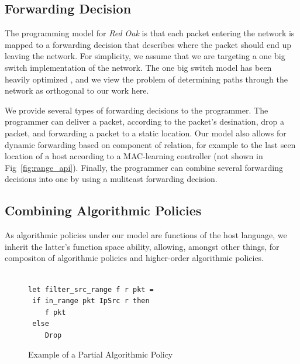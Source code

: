 \documentclass[preprint]{sigplanconf}
\begin{document}
   

     
  

   \subsection*{Forwarding Decision}
	The programming model for \textit{Red Oak} is that each packet entering the network is mapped to a forwarding decision that describes where the packet should end up leaving the network. For simplicity, we assume that we are targeting a one big switch implementation of the network. The one big switch model has been heavily optimized \cite{Obs}, and we view the problem of determining paths through the network as orthogonal to our work here. 
  
   We provide several types of forwarding decisions to the programmer. The programmer can deliver a packet, according to the packet's desination, drop a packet, and forwarding a packet to a static location. Our model also allows for dynamic forwarding based on component of relation, for example to the last seen location of a host according to a MAC-learning controller (not shown in Fig~\ref{fig:range_api}). Finally, the programmer can combine several forwarding decisions into one by using a mulitcast forwarding decision.
   

   \subsection*{Combining Algorithmic Policies}
   As algorithmic policies under our model are functions of the host language, we inherit the latter's function space ability, allowing, amongst other things, for compositon of algorithmic policies and higher-order algorithmic policies.

\begin{figure}[ht]
\begin{lstlisting}

let filter_src_range f r pkt =
 if in_range pkt IpSrc r then
    f pkt
 else
    Drop   
\end{lstlisting}

\caption{Example of a Partial Algorithmic Policy}
\label{fig:ex-hole}
\end{figure}
\end{document}
